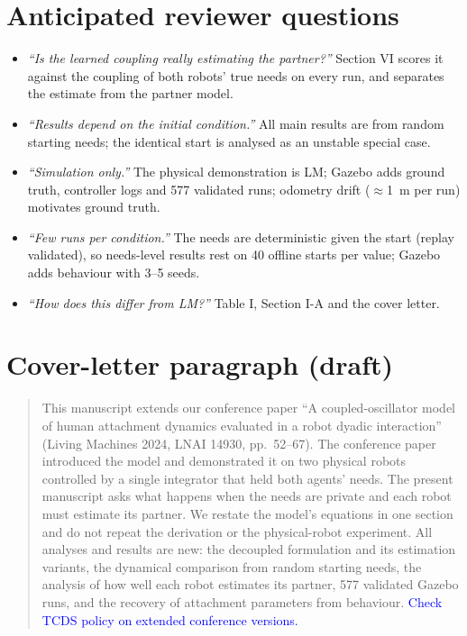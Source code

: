 \documentclass[10pt,a4paper]{article}
\newcommand{\confirm}[1]{\textcolor{blue}{#1}}
\begin{document}
\section{Anticipated reviewer questions}
\begin{itemize}
\item \emph{``Is the learned coupling really estimating the partner?''} Section VI scores it against the coupling of both robots' true needs on every run, and separates the estimate from the partner model.
\item \emph{``Results depend on the initial condition.''} All main results are from random starting needs; the identical start is analysed as an unstable special case.
\item \emph{``Simulation only.''} The physical demonstration is LM; Gazebo adds ground truth, controller logs and 577 validated runs; odometry drift ($\approx$1~m per run) motivates ground truth.
\item \emph{``Few runs per condition.''} The needs are deterministic given the start (replay validated), so needs-level results rest on 40 offline starts per value; Gazebo adds behaviour with 3--5 seeds.
\item \emph{``How does this differ from LM?''} Table I, Section I-A and the cover letter.
\end{itemize}

\section{Cover-letter paragraph (draft)}
\begin{quote}
This manuscript extends our conference paper ``A coupled-oscillator model of human attachment dynamics evaluated in a robot dyadic interaction'' (Living Machines 2024, LNAI 14930, pp.~52--67). The conference paper introduced the model and demonstrated it on two physical robots controlled by a single integrator that held both agents' needs. The present manuscript asks what happens when the needs are private and each robot must estimate its partner. We restate the model's equations in one section and do not repeat the derivation or the physical-robot experiment. All analyses and results are new: the decoupled formulation and its estimation variants, the dynamical comparison from random starting needs, the analysis of how well each robot estimates its partner, 577 validated Gazebo runs, and the recovery of attachment parameters from behaviour. \confirm{Check TCDS policy on extended conference versions.}
\end{quote}
\end{document}
